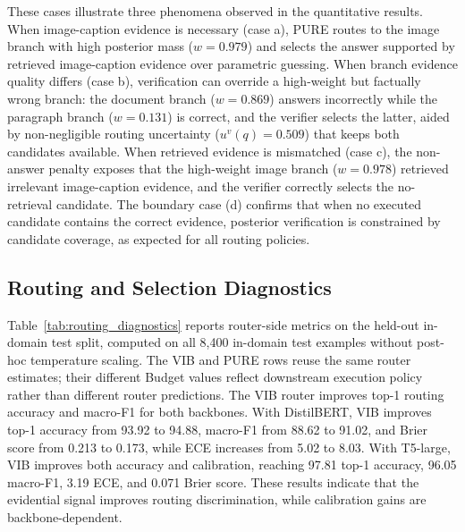 \documentclass[a4paper,fleqn]{cas-dc}
\begin{document}
These cases illustrate three phenomena observed in the quantitative results. When image-caption evidence is necessary (case a), PURE routes to the image branch with high posterior mass ($w=0.979$) and selects the answer supported by retrieved image-caption evidence over parametric guessing. When branch evidence quality differs (case b), verification can override a high-weight but factually wrong branch: the document branch ($w=0.869$) answers incorrectly while the paragraph branch ($w=0.131$) is correct, and the verifier selects the latter, aided by non-negligible routing uncertainty ($u^v(q)=0.509$) that keeps both candidates available. When retrieved evidence is mismatched (case c), the non-answer penalty exposes that the high-weight image branch ($w=0.978$) retrieved irrelevant image-caption evidence, and the verifier correctly selects the no-retrieval candidate. The boundary case (d) confirms that when no executed candidate contains the correct evidence, posterior verification is constrained by candidate coverage, as expected for all routing policies.

\subsection{Routing and Selection Diagnostics}
\label{subsec:routing_selection_diagnostics}

Table~\ref{tab:routing_diagnostics} reports router-side metrics on the held-out in-domain test split, computed on all 8,400 in-domain test examples without post-hoc temperature scaling. The VIB and PURE rows reuse the same router estimates; their different Budget values reflect downstream execution policy rather than different router predictions. The VIB router improves top-1 routing accuracy and macro-F1 for both backbones. With DistilBERT, VIB improves top-1 accuracy from 93.92 to 94.88, macro-F1 from 88.62 to 91.02, and Brier score from 0.213 to 0.173, while ECE increases from 5.02 to 8.03. With T5-large, VIB improves both accuracy and calibration, reaching 97.81 top-1 accuracy, 96.05 macro-F1, 3.19 ECE, and 0.071 Brier score. These results indicate that the evidential signal improves routing discrimination, while calibration gains are backbone-dependent.
\end{document}
